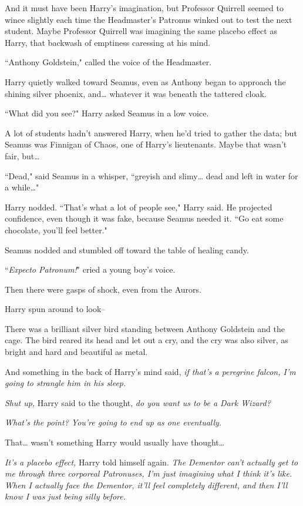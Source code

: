 And it must have been Harry's imagination, but Professor Quirrell seemed to wince slightly each time the Headmaster's Patronus winked out to test the next student. Maybe Professor Quirrell was imagining the same placebo effect as Harry, that backwash of emptiness caressing at his mind.

``Anthony Goldstein," called the voice of the Headmaster.

Harry quietly walked toward Seamus, even as Anthony began to approach the shining silver phoenix, and{\ldots} whatever it was beneath the tattered cloak.

``What did you see?" Harry asked Seamus in a low voice.

A lot of students hadn't answered Harry, when he'd tried to gather the data; but Seamus was Finnigan of Chaos, one of Harry's lieutenants. Maybe that wasn't fair, but{\ldots}

``Dead," said Seamus in a whisper, ``greyish and slimy{\ldots} dead and left in water for a while{\ldots}"

Harry nodded. ``That's what a lot of people see," Harry said. He projected confidence, even though it was fake, because Seamus needed it. ``Go eat some chocolate, you'll feel better."

Seamus nodded and stumbled off toward the table of healing candy.

``\emph{Expecto Patronum!}" cried a young boy's voice.

Then there were gasps of shock, even from the Aurors.

Harry spun around to look\---

There was a brilliant silver bird standing between Anthony Goldstein and the cage. The bird reared its head and let out a cry, and the cry was also silver, as bright and hard and beautiful as metal.

And something in the back of Harry's mind said, \emph{if that's a peregrine falcon, I'm going to strangle him in his sleep.}

\emph{Shut up,} Harry said to the thought, \emph{do you want us to be a Dark Wizard?}

\emph{What's the point? You're going to end up as one eventually.}

That{\ldots} wasn't something Harry would usually have thought{\ldots}

\emph{It's a placebo effect,} Harry told himself again. \emph{The Dementor can't actually get to me through three corporeal Patronuses, I'm just imagining what I think it's like. When I actually face the Dementor, it'll feel completely different, and then I'll know I was just being silly before.}

